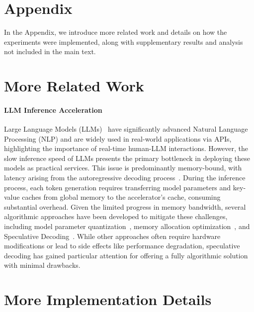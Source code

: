 \section*{Appendix}

In the Appendix, we introduce more related work and details on how the experiments were implemented, along with supplementary results and analysis not included in the main text.

\section{More Related Work}

\paragraph{LLM Inference Acceleration}
Large Language Models (LLMs)~\cite{GPT3, Llama2} have significantly advanced Natural Language Processing (NLP) and are widely used in real-world applications via APIs, highlighting the importance of real-time human-LLM interactions. However, the slow inference speed of LLMs presents the primary bottleneck in deploying these models as practical services. This issue is predominantly memory-bound, with latency arising from the autoregressive decoding process~\cite{latencylagsbandwidth, ScalingTransformerInference, MemoryWall}. During the inference process, each token generation requires transferring model parameters and key-value caches from global memory to the accelerator’s cache, consuming substantial overhead. Given the limited progress in memory bandwidth, several algorithmic approaches have been developed to mitigate these challenges, including model parameter quantization~\cite{ZeroQuant, GPTQ, SqueezeLLM}, memory allocation optimization~\cite{MQAttn, H2O, PagedAttn}, and Speculative Decoding~\cite{BlockWise, SpecDecoding, SpecSampling}.
While other approaches often require hardware modifications or lead to side effects like performance degradation, speculative decoding has gained particular attention for offering a fully algorithmic solution with minimal drawbacks.


\section{More Implementation Details}\label{app:impl}

